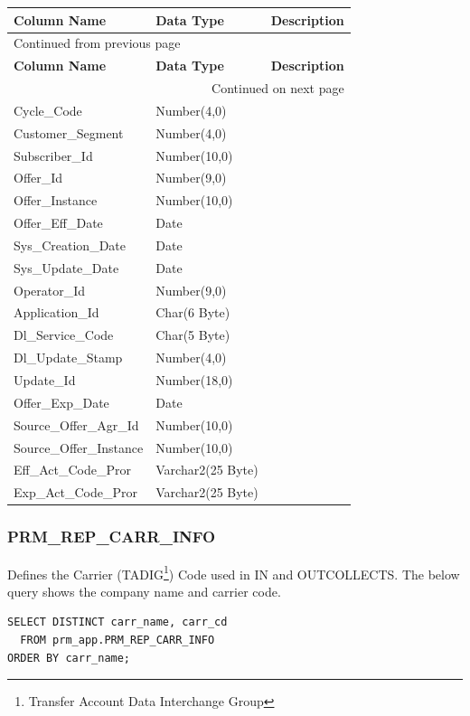 \documentclass[12pt,twoside]{article}
\begin{document}
\begin{longtable}{l|l|l}
\hline
\textbf{Column Name} & \textbf{Data Type} & \textbf{Description}\\
\hline
\endfirsthead
\multicolumn{3}{l}{Continued from previous page} \\
\hline

\textbf{Column Name} & \textbf{Data Type} & \textbf{Description} \\

\hline
\endhead
\hline\multicolumn{3}{r}{Continued on next page} \\
\endfoot
\endlastfoot
\hline
Cycle\_Code & Number(4,0) & \\
Customer\_Segment & Number(4,0) & \\
Subscriber\_Id & Number(10,0) & \\
Offer\_Id & Number(9,0) & \\
Offer\_Instance & Number(10,0) & \\
Offer\_Eff\_Date & Date & \\
Sys\_Creation\_Date & Date & \\
Sys\_Update\_Date & Date & \\
Operator\_Id & Number(9,0) & \\
Application\_Id & Char(6 Byte) & \\
Dl\_Service\_Code & Char(5 Byte) & \\
Dl\_Update\_Stamp & Number(4,0) & \\
Update\_Id & Number(18,0) & \\
Offer\_Exp\_Date & Date & \\
Source\_Offer\_Agr\_Id & Number(10,0) & \\
Source\_Offer\_Instance & Number(10,0) & \\
Eff\_Act\_Code\_Pror & Varchar2(25 Byte) & \\
Exp\_Act\_Code\_Pror & Varchar2(25 Byte) & \\
\hline
\end{longtable}
\normalsize
\subsubsection{PRM\_REP\_CARR\_INFO}
\label{sec:orgheadline104}
Defines the Carrier (TADIG\footnote{Transfer Account Data Interchange Group}) Code used in IN and OUTCOLLECTS.
The below query shows the company name and carrier code.

\begin{verbatim}
SELECT DISTINCT carr_name, carr_cd
  FROM prm_app.PRM_REP_CARR_INFO
ORDER BY carr_name;
\end{verbatim}
\end{document}
